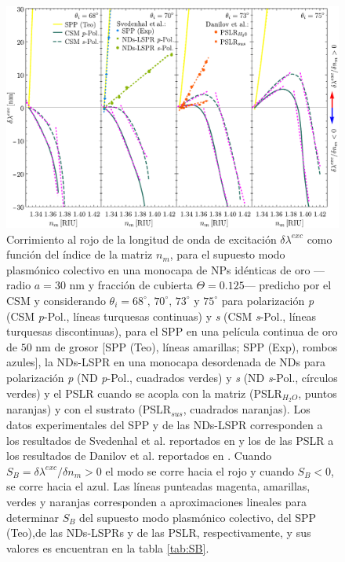 \begin{figure}[b!]\centering
	\includegraphics[width=\linewidth]{2-Resultados/figs/11-SPPCSM/1_comparacionAugtEye.pdf}\vspace*{-.7em}
	\caption{%
Corrimiento al rojo de la longitud de onda de excitación $\delta\lambda^{exc}$ como función del índice de la matriz $n_m$, para el supuesto modo  plasmónico colectivo en una monocapa de NPs idénticas de oro ---radio $a=30$ nm y fracción de cubierta $\Theta=0.125$--- predicho por el CSM y  considerando $\theta_i=68^\circ,\, 70^\circ,\, 73^\circ$ y $75^\circ$ para polarización  \emph{p} (CSM \textit{p}-Pol., líneas turquesas continuas) y \emph{s} (CSM \textit{s}-Pol., líneas turquesas discontinuas), para el SPP en una película continua de oro de $50$ nm de grosor [SPP (Teo), líneas amarillas; SPP (Exp), rombos azules], la NDs-LSPR  en una monocapa desordenada de NDs para polarización \emph{p} (ND \textit{p}-Pol., cuadrados verdes) y \emph{s} (ND \textit{s}-Pol., círculos verdes) y el PSLR cuando se acopla con la matriz (PSLR$_{H_{2}O}$, puntos naranjas) y con el sustrato (PSLR$_{sus}$, cuadrados naranjas). Los datos experimentales del SPP y de las NDs-LSPR corresponden a los resultados de Svedenhal et al. reportados en \cite{svedendahl2009refractometric} y los de las PSLR a los resultados de Danilov et al. reportados en \cite{danilov2018ultra}. Cuando $S_B=\delta\lambda^{exc}/\delta n_m>0$ el modo se corre hacia el rojo y cuando $S_B<0$, se corre hacia el azul. Las líneas punteadas magenta, amarillas, verdes y naranjas corresponden a aproximaciones lineales para determinar $S_B$ del supuesto modo plasmónico colectivo, del SPP (Teo),de las NDs-LSPRs y de las PSLR, respectivamente, y sus valores es encuentran en la tabla  \ref{tab:SB}.}\label{fig:SensThetai}
	\end{figure}	


